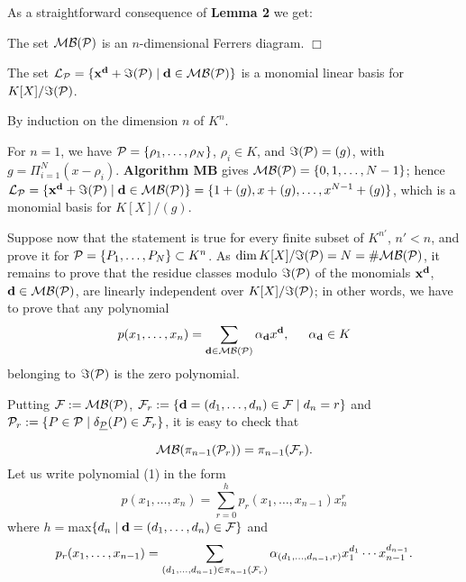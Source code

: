 As a straightforward consequence of {\bf Lemma 2} we get: 

\begin{prop}
The set  ${\cal MB(P)}$ is an $n$-dimensional Ferrers diagram. 
\hfill $\Box$
\end{prop}

\begin{prop}
The set
${\cal L}_{\cal  P}=\{{\bf x^d}+\Im({\cal P}) \mid {\bf d}\in 
{\cal MB(P)}\}$ is a monomial  linear  basis  for 
$K[X]/\Im({\cal P})$.
\end{prop} 
\prova 
By induction on the dimension $n$ of $K^n$.

For $n=1$, we have ${\cal P}=\{\rho_1,\ldots,\rho_N\}$, $\rho_i\in 
K$, and $\Im({\cal P})=(g)$, with $g=\Pi_{i=1}^N  (x-\rho_i)$.  {\bf 
Algorithm MB} gives ${\cal MB(P)}=\{0,1,\ldots,N-1\}$; hence 
${\cal L}_{\cal  P}=\{{\bf x^d}+\Im({\cal P}) \mid 
{\bf d}\in {\cal  MB(P)}\}=\{1+(g),x+(g),\ldots,x^{N-1}+(g)\}$, 
which  is  a monomial basis for $K[X]/(g)$. 

Suppose now that the statement is true for every finite subset  of 
$K^{n'}$, $n'<n$, and prove it  for  ${\cal  P}=\{P_1,\ldots,P_N\} 
\subset K^n$. As $\dim K[X]/\Im({\cal P})=N=\#{\cal  MB(P)}$, it
remains to prove that the residue classes modulo $\Im({\cal P})$ of 
the monomials ${\bf x^d}$, ${\bf d}\in {\cal  MB(P)}$, are 
linearly independent over $K[X]/\Im({\cal P})$; in other words, we 
have to prove that any polynomial 
\begin{equation}
p(x_1,\ldots,x_n)=\sum_{{\bf d}\in {\cal  MB(P)}} \alpha_{\bf d}
x^{\bf d},  \indent \alpha_{\bf d}\in K
\end{equation}
belonging to $\Im({\cal P})$ is the zero polynomial. 

Putting ${\cal F}:={\cal  MB(P)}$, 
${\cal F}_r:=\{{\bf d}=(d_1,\ldots,d_n)\in {\cal F}\mid d_n=r\}$ and
${\cal P}_r:=\{P\in {\cal P}\mid \delta_{\underline{\cal P}}(P) \in
{\cal F}_r\}$, it is easy to check that

\begin{equation}
{\cal MB}(\pi_{n-1}({\cal P}_r))= \pi_{n-1}({\cal F}_r).
\end{equation}
Let us write polynomial (1) in the form
\begin{equation}
p(x_1,\ldots,x_n)=\sum_{r=0}^h p_r(x_1,\ldots,x_{n-1})x_n^r
\end{equation}
where $h=$max$\{ d_n\mid {\bf d}=(d_1,\ldots,d_n)\in {\cal F}\}$ and
\begin{equation}
p_r(x_1,\ldots,x_{n-1})=
\sum_{(d_1,\ldots,d_{n-1})\in \pi_{n-1}({\cal F}_r)}
\alpha_{(d_1,\ldots,d_{n-1},r)} x_1^{d_1}\cdots x_{n-1}^{d_{n-1}}.
\end{equation}

